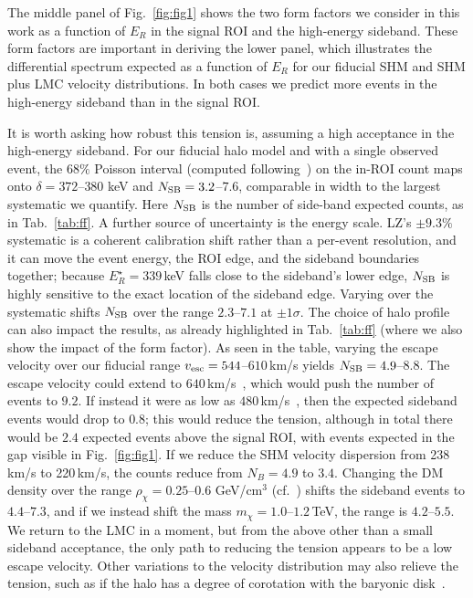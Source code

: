 \documentclass[reprint,superscriptaddress,preprintnumbers,amsmath,amssymb,aps,prd,tightenlines,longbibliography,nofootinbib]{revtex4-2}
\begin{document}
The middle panel of Fig.~\ref{fig:fig1} shows the two form factors we consider in this work as a function of $E_R$ in the signal ROI and the high-energy sideband. These form factors are important in deriving the lower panel, which illustrates the differential spectrum expected as a function of $E_R$ for our fiducial SHM and SHM plus LMC velocity distributions. In both cases we predict more events in the high-energy sideband than in the signal ROI.  


It is worth asking how robust this tension is, assuming a high acceptance in the high-energy sideband.
For our fiducial halo model and with a single observed event, the $68\%$ Poisson interval (computed following~\cite{Feldman:1997qc}) on the in-ROI count maps onto $\delta = 372$--$380$ keV and $N_{\rm SB} = 3.2$--$7.6$,  comparable in width to the largest systematic we quantify.
Here $N_{\rm SB}$ is the number of side-band expected counts, as in Tab.~\ref{tab:ff}.
A further source of uncertainty is the energy scale.
LZ's $\pm 9.3\%$ systematic is a coherent calibration shift rather than a per-event resolution, and it can move the event energy, the ROI edge, and the sideband boundaries together; because $E_R^\star = 339$\,keV falls close to the sideband's lower edge, $N_{\rm SB}$ is highly sensitive to the exact location of the sideband edge.
Varying over the systematic shifts $N_{\rm SB}$ over the range $2.3$--$7.1$ at $\pm 1\sigma$.
The choice of halo profile can also impact the results, as already highlighted in Tab.~\ref{tab:ff} (where we also show the impact of the form factor).
As seen in the table, varying the escape velocity over our fiducial range $v_{\rm esc} = 544$--$610$\,km/s yields $N_{\rm SB} = 4.9$--$8.8$.
The escape velocity could extend to $640$\,km/s~\cite{Monari:2018ckf}, which would push the number of events to $9.2$.
If instead it were as low as $480$\,km/s~\cite{Necib:2021yhq,Necib:2021vxr}, then the expected sideband events would drop to $0.8$; this would reduce the tension, although in total there would be $2.4$ expected events above the signal ROI, with events expected in the gap visible in Fig.~\ref{fig:fig1}.
If we reduce the SHM velocity dispersion from 238\,km/s to 220\,km/s, the counts reduce from $N_B = 4.9$ to $3.4$.
Changing the DM density over the range $\rho_\chi = 0.25$--$0.6$ GeV/cm$^3$ (cf.~\cite{deSalas:2020hbh}) shifts the sideband events to $4.4$--$7.3$, and if we instead shift the mass $m_\chi = 1.0$--$1.2$\,TeV, the range is $4.2$--$5.5$.
We return to the LMC in a moment, but from the above other than a small sideband acceptance, the only path to reducing the tension appears to be a low escape velocity.
Other variations to the velocity distribution may also relieve the tension, such as if the halo has a degree of corotation with the baryonic disk~\cite{Folsom:2026dqs}.
\end{document}
